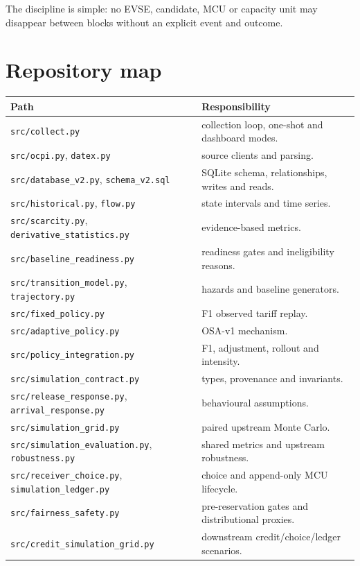 \documentclass[11pt,a4paper]{article}
\newcommand{\code}[1]{\texttt{#1}}
\begin{document}
The discipline is simple: no EVSE, candidate, MCU or capacity unit may disappear between blocks without an explicit event and outcome.

\section{Repository map}

\begin{longtable}{p{5.4cm}p{10.6cm}}
\toprule Path & Responsibility \\\midrule\endhead
\code{src/collect.py} & collection loop, one-shot and dashboard modes. \\
\code{src/ocpi.py}, \code{datex.py} & source clients and parsing. \\
\code{src/database\_v2.py}, \code{schema\_v2.sql} & SQLite schema, relationships, writes and reads. \\
\code{src/historical.py}, \code{flow.py} & state intervals and time series. \\
\code{src/scarcity.py}, \code{derivative\_statistics.py} & evidence-based metrics. \\
\code{src/baseline\_readiness.py} & readiness gates and ineligibility reasons. \\
\code{src/transition\_model.py}, \code{trajectory.py} & hazards and baseline generators. \\
\code{src/fixed\_policy.py} & F1 observed tariff replay. \\
\code{src/adaptive\_policy.py} & OSA-v1 mechanism. \\
\code{src/policy\_integration.py} & F1, adjustment, rollout and intensity. \\
\code{src/simulation\_contract.py} & types, provenance and invariants. \\
\code{src/release\_response.py}, \code{arrival\_response.py} & behavioural assumptions. \\
\code{src/simulation\_grid.py} & paired upstream Monte Carlo. \\
\code{src/simulation\_evaluation.py}, \code{robustness.py} & shared metrics and upstream robustness. \\
\code{src/receiver\_choice.py}, \code{simulation\_ledger.py} & choice and append-only MCU lifecycle. \\
\code{src/fairness\_safety.py} & pre-reservation gates and distributional proxies. \\
\code{src/credit\_simulation\_grid.py} & downstream credit/choice/ledger scenarios. \\

\end{longtable}
\end{document}
